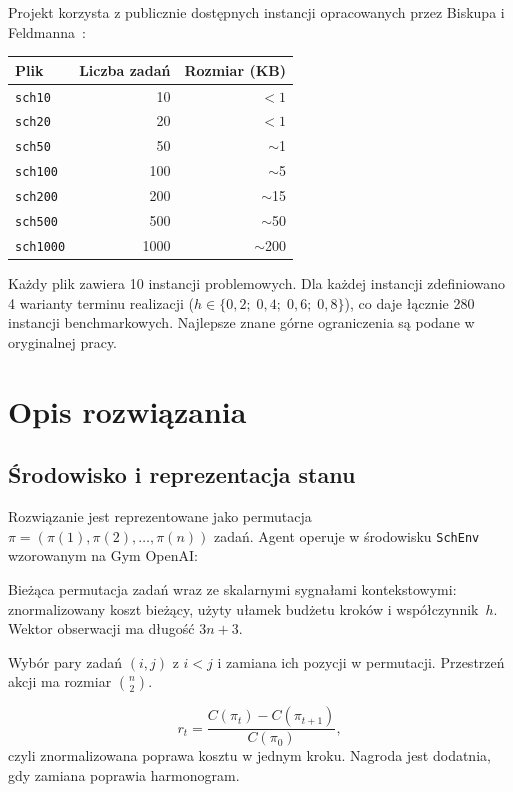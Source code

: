 \documentclass[11pt,a4paper]{article}
\begin{document}
Projekt korzysta z publicznie dostępnych instancji opracowanych przez
Biskupa i Feldmanna~\cite{biskup2001}:

\begin{center}
\begin{tabular}{@{}lrr@{}}
\toprule
\textbf{Plik} & \textbf{Liczba zadań} & \textbf{Rozmiar (KB)} \\
\midrule
\texttt{sch10}    &    10 & $<1$ \\
\texttt{sch20}    &    20 & $<1$ \\
\texttt{sch50}    &    50 &  $\sim$1 \\
\texttt{sch100}   &   100 &  $\sim$5 \\
\texttt{sch200}   &   200 & $\sim$15 \\
\texttt{sch500}   &   500 & $\sim$50 \\
\texttt{sch1000}  &  1000 & $\sim$200 \\
\bottomrule
\end{tabular}
\end{center}

Każdy plik zawiera 10 instancji problemowych.
Dla każdej instancji zdefiniowano 4 warianty terminu realizacji
($h \in \{0{,}2;\; 0{,}4;\; 0{,}6;\; 0{,}8\}$),
co daje łącznie 280 instancji benchmarkowych.
Najlepsze znane górne ograniczenia są podane w oryginalnej pracy.

\section{Opis rozwiązania}

\subsection{Środowisko i reprezentacja stanu}

Rozwiązanie jest reprezentowane jako permutacja
$\pi = (\pi(1), \pi(2), \ldots, \pi(n))$ zadań.
Agent operuje w środowisku \texttt{SchEnv} wzorowanym na Gym OpenAI:

\begin{description}[style=nextline, leftmargin=2.5cm]
  \item[\normalfont\textit{Stan}]
    Bieżąca permutacja zadań wraz ze skalarnymi sygnałami kontekstowymi:
    znormalizowany koszt bieżący, użyty ułamek budżetu kroków i współczynnik~$h$.
    Wektor obserwacji ma długość $3n + 3$.

  \item[\normalfont\textit{Akcja}]
    Wybór pary zadań $(i, j)$ z $i < j$ i zamiana ich pozycji w permutacji.
    Przestrzeń akcji ma rozmiar $\binom{n}{2}$.

  \item[\normalfont\textit{Nagroda}]
    \[
      r_t = \frac{C(\pi_t) - C(\pi_{t+1})}{C(\pi_0)},
    \]
    czyli znormalizowana poprawa kosztu w jednym kroku.
    Nagroda jest dodatnia, gdy zamiana poprawia harmonogram.
\end{description}
\end{document}
